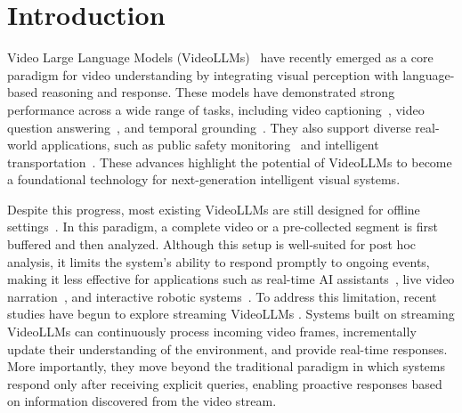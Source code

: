\section{Introduction}\label{sec:intro}

Video Large Language Models (VideoLLMs)~\citep{zhang2023video, maaz2024video, lin2024video, ren2024timechat, li2024llava} have recently emerged as a core paradigm for video understanding by integrating visual perception with language-based reasoning and response. These models have demonstrated strong performance across a wide range of tasks, including video captioning~\citep{yang2023vid2seq,wang2024tarsier,abdar2024review}, video question answering~\citep{li2024mvbench,wu2024longvideobench,fu2025video,song2025moviechat+}, and temporal grounding~\citep{lin2023univtg,qu2024chatvtg}. They also support diverse real-world applications, such as public safety monitoring~\citep{cournan2016improving,ahn2023safefac} and intelligent transportation~\citep{wan2020intelligent,vishal2024eyes,zhang2025language}. These advances highlight the potential of VideoLLMs to become a foundational technology for next-generation intelligent visual systems.

Despite this progress, most existing VideoLLMs are still designed for offline settings~\citep{shen2024longvu,zhang2024llava,wang2025internvl3}. In this paradigm, a complete video or a pre-collected segment is first buffered and then analyzed. Although this setup is well-suited for post hoc analysis, it limits the system's ability to respond promptly to ongoing events, making it less effective for applications such as real-time AI assistants~\citep{qian2025dispider,wang2025streambridge,seed2026vision}, live video narration~\citep{chen2025livecc,xu2025streamingvlm}, and interactive robotic systems~\citep{lynch2023interactive,fang2025robix}. To address this limitation, recent studies have begun to explore streaming VideoLLMs \citep{chen2024videollm,yao2025timechat,wang2025mmduet2,seed2026vision}. Systems built on streaming VideoLLMs can continuously process incoming video frames, incrementally update their understanding of the environment, and provide real-time responses. More importantly, they move beyond the traditional paradigm in which systems respond only after receiving explicit queries, enabling proactive responses based on information discovered from the video stream.

